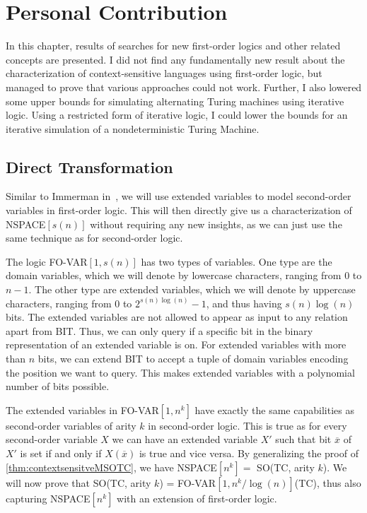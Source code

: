 \chapter{Personal Contribution}\label{ch:personal-contribution}

In this chapter, results of searches for new first-order logics and other related concepts are presented.
I did not find any fundamentally new result about the characterization of context-sensitive languages using first-order logic, but managed to prove that various approaches could not work.
Further, I also lowered some upper bounds for simulating alternating Turing machines using iterative logic.
Using a restricted form of iterative logic, I could lower the bounds for an iterative simulation of a nondeterministic Turing Machine.

\section{Direct Transformation}\label{sec:direct-transformation}

Similar to Immerman in~\cite{descriptive-complexity}, we will use extended variables to model second-order variables in first-order logic.
This will then directly give us a characterization of NSPACE$[s(n)]$ without requiring any new insights, as we can just use the same technique as for second-order logic.

\begin{define}
    The logic FO-VAR$[1, s(n)]$ has two types of variables.
    One type are the domain variables, which we will denote by lowercase characters, ranging from $0$ to $n - 1$.
    The other type are extended variables, which we will denote by uppercase characters, ranging from $0$ to $2^{s(n)\log(n)} - 1$, and thus having $s(n)\log(n)$ bits.
    The extended variables are not allowed to appear as input to any relation apart from BIT.
    Thus, we can only query if a specific bit in the binary representation of an extended variable is on.
    For extended variables with more than $n$ bits, we can extend BIT to accept a tuple of domain variables encoding the position we want to query.
    This makes extended variables with a polynomial number of bits possible.
\end{define}

The extended variables in FO-VAR$[1, n^k]$ have exactly the same capabilities as second-order variables of arity $k$ in second-order logic.
This is true as for every second-order variable $X$ we can have an extended variable $X'$ such that bit $\overline{x}$ of $X'$ is set if and only if $X(\overline{x})$ is true and vice versa.
By generalizing the proof of \cref{thm:contextsensitveMSOTC}, we have NSPACE$[n^k] = $ SO(TC, arity $k$).
We will now prove that SO(TC, arity $k$) = FO-VAR$[1, n^k/\log(n)]$(TC), thus also capturing NSPACE$[n^k]$ with an extension of first-order logic.

